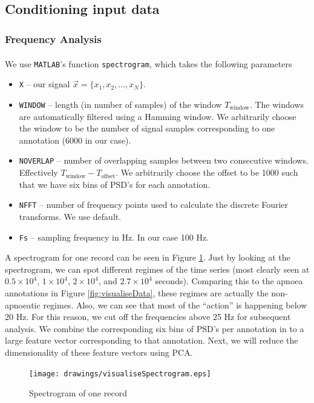 \subsection{Conditioning input data}

\subsubsection{Frequency Analysis}
	We use \verb!MATLAB!\textsuperscript{\textregistered}'s function \verb|spectrogram|, which takes the following parameters
	\begin{itemize}
		\item \verb!X! -- our signal $\vec x = \{x_1, x_2, \dotsc, x_N\}$.
		\item \verb!WINDOW! -- length (in number of samples) of the window $T_\text{window}$. The windows are automatically filtered using a Hamming window. We arbitrarily choose the window to be the number of signal samples corresponding to one annotation (6000 in our case).
		\item \verb!NOVERLAP! -- number of overlapping samples between two consecutive windows. Effectively $T_\text{window} - T_\text{offset}$. We arbitrarily choose the offset to be 1000 such that we have six bins of PSD's for each annotation.
		\item \verb!NFFT! -- number of frequency points used to calculate the discrete Fourier transforms. We use default.
		\item \verb!Fs! -- sampling frequency in Hz. In our case 100 Hz.
	\end{itemize}

	A spectrogram for one record can be seen in Figure \ref{fig:visualiseSpectrogram}. Just by looking at the spectrogram, we can spot different regimes of the time series (most clearly seen at $0.5 \times 10^4$, $1 \times 10^4$, $2 \times 10^4$, and $2.7 \times 10^4$ seconds). Comparing this to the apnoea annotations in Figure \ref{fig:visualiseData}, these regimes are actually the non-apnoeatic regimes. Also, we can see that most of the ``action'' is happening below 20 Hz. For this reason, we cut off the frequencies above 25 Hz for subsequent analysis. We combine the corresponding six bins of PSD's per annotation in to a large feature vector corresponding to that annotation. Next, we will reduce the dimensionality of these feature vectors using PCA.
	\begin{figure}[ht!]
		\centering
			\texttt{[image: drawings/visualiseSpectrogram.eps]}
		\caption{Spectrogram of one record}
		\label{fig:visualiseSpectrogram}
	\end{figure}

